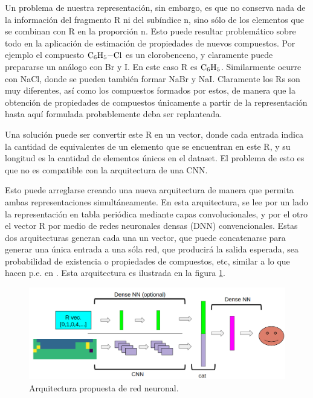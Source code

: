 \documentclass[twoside,twocolumn]{article}
\begin{document}
Un problema de nuestra representaci\'on, sin embargo, es que no conserva nada de la informaci\'on del fragmento R ni del sub\'indice n, sino s\'olo de los elementos que se combinan con R en la proporci\'on n. Esto puede resultar problem\'atico sobre todo en la aplicaci\'on de estimaci\'on de propiedades de nuevos compuestos. Por ejemplo el compuesto $\ce{C6H5-Cl}$ es un clorobenceno, y claramente puede prepararse un an\'alogo con Br y I. En este caso R es $\ce{C6H5}$. Similarmente ocurre con NaCl, donde se pueden tambi\'en formar NaBr y NaI. Claramente los Rs son muy diferentes, as\'i como los compuestos formados por estos, de manera que la obtenci\'on de propiedades de compuestos \'unicamente a partir de la representaci\'on hasta aqu\'i formulada probablemente deba ser replanteada.

Una soluci\'on puede ser convertir este R en un vector, donde cada entrada indica la cantidad de equivalentes de un elemento que se encuentran en este R, y su longitud es la cantidad de elementos \'unicos en el dataset. El problema de esto es que no es compatible con la arquitectura de una CNN.

Esto puede arreglarse creando una nueva arquitectura de manera que permita ambas representaciones simult\'aneamente. En esta arquitectura, se lee por un lado la representaci\'on en tabla peri\'odica mediante capas convolucionales, y por el otro el vector R por medio de redes neuronales densas (DNN) convencionales. Estas dos arquitecturas generan cada una un vector, que puede concatenarse para generar una \'unica entrada a una s\'ola red, que producir\'a la salida esperada, sea probabilidad de existencia o propiedades de compuestos, etc, similar a lo que hacen p.e. en \cite{parallelNN}. Esta arquitectura es ilustrada en la figura \ref{fig:fig2}.

\begin{figure}[t!]
\centering
\renewcommand{\figurename}{Figura}
\caption{Arquitectura propuesta de red neuronal.}
\label{fig:fig2}
\includegraphics[width=19cm]{CDDNN.png}
\end{figure}




\renewcommand\refname{Referencias}


\end{document}
